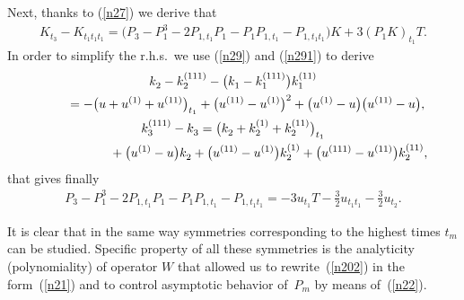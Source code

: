 \documentclass[pdftex]{sigma}
\numberwithin{equation}{section}
\begin{document}
Next, thanks to (\ref{n27}) we derive that
\begin{gather}
 K_{t_3}-K_{t_1t_1t_1}=\big(P_{3}-P_{1}^{3}-2P_{1,t_1}P_{1}-P_{1}P_{1,t_1}-P_{1,t_1t_1}\big)K +3(P_{1}K)_{t_1}T.\label{n314}
\end{gather}
In order to simplify the r.h.s.\ we use (\ref{n29}) and (\ref{n291}) to derive
\begin{gather*}
k_{2}^{}-k_{2}^{(111)}-\big(k_{1}^{}-k_{1}^{(111)}\big)k_{1}^{(11)}\\
\qquad{} =-\big(u+u_{}^{(1)}+u_{}^{(11)}\big)_{t_1} +\big(u^{(11)}-u^{(1)}\big)^{ 2 } +\big(u^{(1)}-u\big)\big(u^{(11)}-u\big),\\ %
k_{3}^{(111)}-k_{3}^{}=\big(k_{2}^{}+k_{2}^{(1)}+k_{2}^{(11)}\big)_{t_1} \\
\hphantom{k_{3}^{(111)}-k_{3}^{}=}{} +\big(u^{(1)}-u\big)k_{2}^{}+\big(u^{(11)}-u^{(1)}\big)k_{2}^{(1)}+\big(u^{(111)}-u^{(11)}\big)k_{2}^{(11)},%
\end{gather*}
that gives f\/inally
\begin{gather}
P_{3}-P_{1}^{3}-2P_{1,t_1}P_{1}-P_{1}P_{1,t_1}-P_{1,t_1t_1}=-3u_{t_1}T-\frac{3}{2}u_{t_1t_1}- \frac{3}{2}u_{t_2}.\label{n315}
\end{gather}

It is clear that in the same way symmetries corresponding to the highest times $t_{m}$ can be studied. Specif\/ic property of all these symmetries is the analyticity (polynomiality) of operator $W$ that allowed us to rewrite~(\ref{n202}) in the form~(\ref{n21}) and to control asymptotic behavior of~$P_{m}$ by means of~(\ref{n22}).
\end{document}
